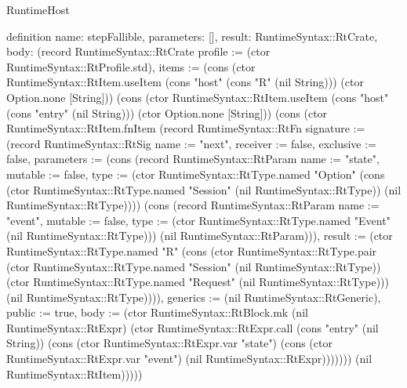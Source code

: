\begin{lexlean}{RuntimeHost}
\begin{semanticmodule}
definition{
  name: stepFallible,
  parameters: [],
  result: RuntimeSyntax::RtCrate,
  body: (record RuntimeSyntax::RtCrate {profile := (ctor RuntimeSyntax::RtProfile.std), items := (cons (ctor RuntimeSyntax::RtItem.useItem (cons "host" (cons "R" (nil String))) (ctor Option.none [String])) (cons (ctor RuntimeSyntax::RtItem.useItem (cons "host" (cons "entry" (nil String))) (ctor Option.none [String])) (cons (ctor RuntimeSyntax::RtItem.fnItem (record RuntimeSyntax::RtFn {signature := (record RuntimeSyntax::RtSig {name := "next", receiver := false, exclusive := false, parameters := (cons (record RuntimeSyntax::RtParam {name := "state", mutable := false, type := (ctor RuntimeSyntax::RtType.named "Option" (cons (ctor RuntimeSyntax::RtType.named "Session" (nil RuntimeSyntax::RtType)) (nil RuntimeSyntax::RtType)))}) (cons (record RuntimeSyntax::RtParam {name := "event", mutable := false, type := (ctor RuntimeSyntax::RtType.named "Event" (nil RuntimeSyntax::RtType))}) (nil RuntimeSyntax::RtParam))), result := (ctor RuntimeSyntax::RtType.named "R" (cons (ctor RuntimeSyntax::RtType.pair (ctor RuntimeSyntax::RtType.named "Session" (nil RuntimeSyntax::RtType)) (ctor RuntimeSyntax::RtType.named "Request" (nil RuntimeSyntax::RtType))) (nil RuntimeSyntax::RtType)))}), generics := (nil RuntimeSyntax::RtGeneric), public := true, body := (ctor RuntimeSyntax::RtBlock.mk (nil RuntimeSyntax::RtExpr) (ctor RuntimeSyntax::RtExpr.call (cons "entry" (nil String)) (cons (ctor RuntimeSyntax::RtExpr.var "state") (cons (ctor RuntimeSyntax::RtExpr.var "event") (nil RuntimeSyntax::RtExpr)))))})) (nil RuntimeSyntax::RtItem))))})
}


\end{semanticmodule}
\end{lexlean}
